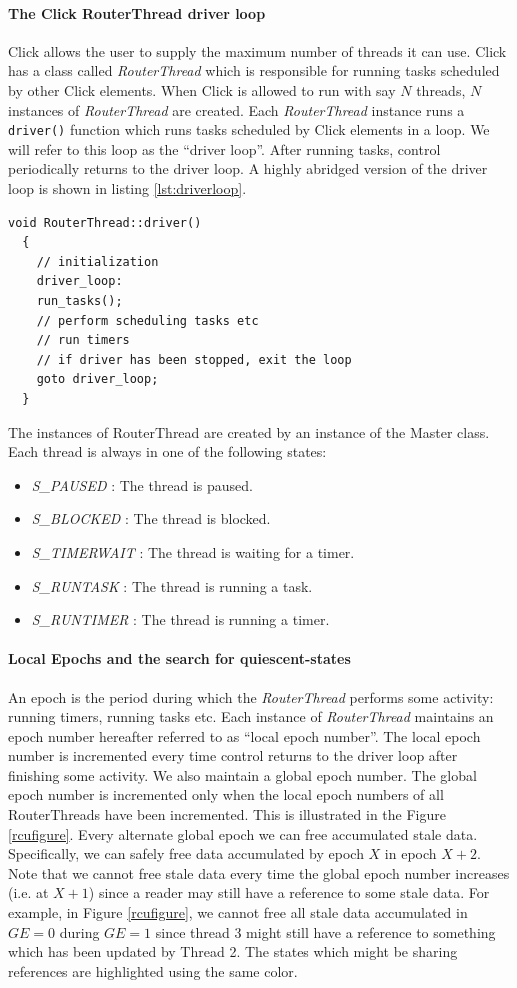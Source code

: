 \documentclass[a4paper,marginparwidth=50pt,marginparsep=10pt]{article}
\begin{document}
\paragraph{The Click RouterThread driver loop}
Click allows the user to supply the maximum number of threads it can use. Click has a class called \emph{RouterThread} which is responsible for running tasks scheduled by other Click elements. When Click is allowed to run with say $N$ threads, $N$ instances of \emph{RouterThread} are created. Each \emph{RouterThread} instance runs a \verb+driver()+ function which runs tasks scheduled by Click elements in a loop. We will refer to this loop as the ``driver loop''. After running tasks, control periodically returns to the driver loop. A highly abridged version of the driver loop is shown in listing \ref{lst:driverloop}.
\begin{lstlisting}[caption = Pseudocode for the driver loop, label=lst:driverloop]
  void RouterThread::driver()
  {
    // initialization 
    driver_loop:
    run_tasks();
    // perform scheduling tasks etc
    // run timers
    // if driver has been stopped, exit the loop
    goto driver_loop;
  }
\end{lstlisting}
The instances of RouterThread are created by an instance of the Master class. Each thread is always in one of the following states:
\begin{itemize}
\item \emph{S\_PAUSED} : The thread is paused.
\item \emph{S\_BLOCKED} : The thread is blocked.
\item \emph{S\_TIMERWAIT} : The thread is waiting for a timer.
\item \emph{S\_RUNTASK} : The thread is running a task.
\item \emph{S\_RUNTIMER} : The thread is running a timer.
\end{itemize}
\paragraph{Local Epochs and the search for quiescent-states}
An epoch is the period during which the \emph{RouterThread} performs some activity: running timers, running tasks etc. Each instance of \emph{RouterThread} maintains an epoch number hereafter referred to as ``local epoch number''. The local epoch number is incremented every time control returns to the driver loop after finishing some activity. We also maintain a global epoch number. The global epoch number is incremented only when the local epoch numbers of all RouterThreads have been incremented. This is illustrated in the Figure \ref{rcufigure}. Every alternate global epoch we can free accumulated stale data. Specifically, we can safely free data accumulated by epoch $X$ in epoch $X+2$. Note that we cannot free stale data every time the global epoch number increases (i.e. at $X+1$) since a reader may still have a reference to some stale data. For example, in Figure \ref{rcufigure}, we cannot free all stale data accumulated in $GE=0$ during $GE=1$ since thread 3 might still have a reference to something which has been updated by Thread 2. The states which might be sharing references are highlighted using the same color.
\end{document}
